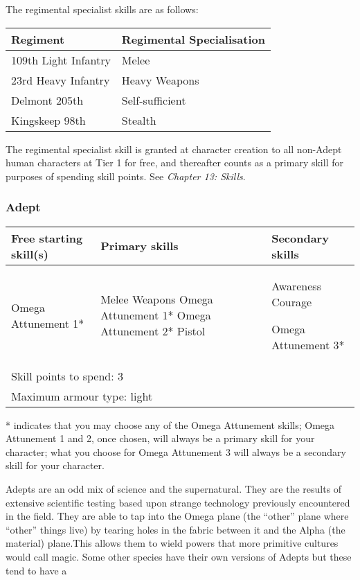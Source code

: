 The regimental specialist skills are as follows:

\begin{table}[H]
\begin{tabular}{|l|l|} \hline 
Regiment & Regimental Specialisation \\
 \hline 109th Light Infantry & Melee \\
 \hline 23rd Heavy Infantry & Heavy Weapons \\
 \hline Delmont 205th & Self-sufficient \\
 \hline Kingskeep 98th & Stealth \\
 \hline \end{tabular}

\end{table}

The regimental specialist skill is granted at character creation to all non-Adept human characters at Tier 1 for free, and thereafter counts as a primary skill for purposes of spending skill points. See \textit{Chapter 13: Skills}.

\subsubsection{Adept}

\begin{table}[H]
\begin{tabular}{|l|l|l|} \hline 
Free starting skill(s) & Primary skills & Secondary skills \\
 \hline Omega Attunement 1* & Melee Weapons Omega Attunement 1* Omega Attunement 2* Pistol & Awareness Courage\par Omega Attunement 3* \\
 \hline \multicolumn{3}{|l|}{Skill points to spend: 3} \\
 \hline \multicolumn{3}{|l|}{Maximum armour type: light} \\
 \hline \end{tabular}

\end{table}

* indicates that you may choose any of the Omega Attunement skills; Omega Attunement 1 and 2, once chosen, will always be a primary skill for your character; what you choose for Omega Attunement 3 will always be a secondary skill for your character.

Adepts are an odd mix of science and the supernatural. They are the results of extensive scientific testing based upon strange technology previously encountered in the field. They are able to tap into the Omega plane (the ``other'' plane where ``other'' things live) by tearing holes in the fabric between it and the Alpha (the material) plane.This allows them to wield powers that more primitive cultures would call magic. Some other species have their own versions of Adepts but these tend to have a

